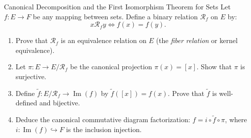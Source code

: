 \begin{exercise}{Canonical Decomposition and the First Isomorphism Theorem for Sets}
Let $f: E \to F$ be any mapping between sets. Define a binary relation $\mathcal{R}_f$ on $E$ by:
\[
x \mathcal{R}_f y \iff f(x) = f(y).
\]
\begin{enumerate}[leftmargin=1.5em,itemsep=2pt]
  \item Prove that $\mathcal{R}_f$ is an equivalence relation on $E$ (the \emph{fiber relation} or kernel equivalence).
  \item Let $\pi: E \to E/\mathcal{R}_f$ be the canonical projection $\pi(x) = [x]$. Show that $\pi$ is surjective.
  \item Define $\tilde{f}: E/\mathcal{R}_f \to \operatorname{Im}(f)$ by $\tilde{f}([x]) = f(x)$.
  Prove that $\tilde{f}$ is well-defined and bijective.
  \item Deduce the canonical commutative diagram factorization: $f = i \circ \tilde{f} \circ \pi$, where $i: \operatorname{Im}(f) \hookrightarrow F$ is the inclusion injection.
\end{enumerate}
\end{exercise}

\begin{tabletworkspace}[5.5cm]
\end{tabletworkspace}

